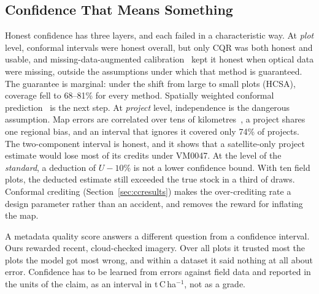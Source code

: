 \documentclass[conference,a4paper]{IEEEtran}
\begin{document}
\subsection{Confidence That Means Something}
Honest confidence has three layers, and each failed in a characteristic way. At \emph{plot} level, conformal intervals were honest overall, but only CQR was both honest and usable, and missing-data-augmented calibration~\cite{zaffran2023conformal} kept it honest when optical data were missing, outside the assumptions under which that method is guaranteed. The guarantee is marginal: under the shift from large to small plots (HCSA), coverage fell to 68--81\% for every method. Spatially weighted conformal prediction~\cite{tibshirani2019conformal,mao2024spatial} is the next step. At \emph{project} level, independence is the dangerous assumption. Map errors are correlated over tens of kilometres~\cite{araza2022comprehensive}, a project shares one regional bias, and an interval that ignores it covered only 74\% of projects. The two-component interval is honest, and it shows that a satellite-only project estimate would lose most of its credits under VM0047. At the level of the \emph{standard}, a deduction of $U-10\%$ is not a lower confidence bound. With ten field plots, the deducted estimate still exceeded the true stock in a third of draws. Conformal crediting (Section~\ref{sec:ccresults}) makes the over-crediting rate a design parameter rather than an accident, and removes the reward for inflating the map.

A metadata quality score answers a different question from a confidence interval. Ours rewarded recent, cloud-checked imagery. Over all plots it trusted most the plots the model got most wrong, and within a dataset it said nothing at all about error. Confidence has to be learned from errors against field data and reported in the units of the claim, as an interval in t\,C\,ha$^{-1}$, not as a grade.
\end{document}
